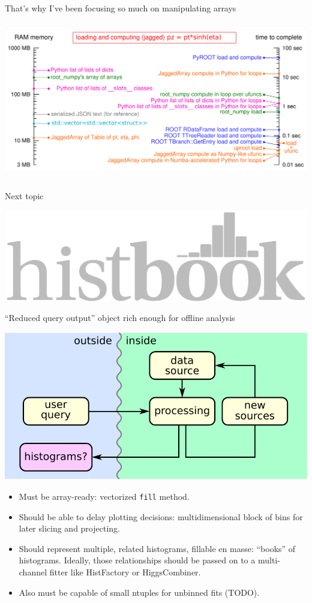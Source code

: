 \documentclass[aspectratio=169]{beamer}
\begin{document}
\begin{frame}{That's why I've been focusing so much on manipulating arrays}
\vspace{0.3 cm}
\begin{columns}
\includegraphics[width=\linewidth]{logscales.pdf}
\end{columns}
\end{frame}

\begin{frame}{Next topic}
\Large
\vspace{1 cm}
\begin{center}
\includegraphics[width=0.4\linewidth]{histbook-logo.pdf}
\end{center}
\end{frame}

\begin{frame}{``Reduced query output'' object rich enough for offline analysis}
\vspace{0.15 cm}
\large
\begin{center}
\includegraphics[width=0.5\linewidth]{basic-block-diagram-2.pdf}
\end{center}

\begin{itemize}\setlength{\itemsep}{0.1 cm}
\item Must be array-ready: vectorized {\tt\small fill} method.
\item Should be able to delay plotting decisions: multidimensional block of bins for later slicing and projecting.
\item Should represent multiple, related histograms, fillable en masse: ``books'' of histograms. Ideally, those relationships should be passed on to a multi-channel fitter like HistFactory or HiggsCombiner.
\item Also must be capable of small ntuples for unbinned fits (TODO).
\end{itemize}
\end{frame}
\end{document}
